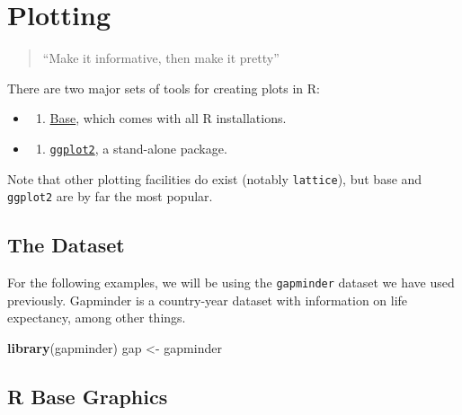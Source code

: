 \documentclass[
]{book}
\newenvironment{Shaded}{\begin{snugshade}}{\end{snugshade}}
\newcommand{\KeywordTok}[1]{\textcolor[rgb]{0.13,0.29,0.53}{\textbf{#1}}}
\newcommand{\NormalTok}[1]{#1}
\newcommand{\StringTok}[1]{\textcolor[rgb]{0.31,0.60,0.02}{#1}}
\providecommand{\tightlist}{%
  \setlength{\itemsep}{0pt}\setlength{\parskip}{0pt}}
\begin{document}
\hypertarget{plotting}{%
\chapter{Plotting}\label{plotting}}

\begin{quote}
``Make it informative, then make it pretty''
\end{quote}

There are two major sets of tools for creating plots in R:

\begin{itemize}
\item
  \begin{enumerate}
  \def\labelenumi{\arabic{enumi}.}
  \tightlist
  \item
    \protect\hyperlink{1-r-base-graphics}{Base}, which comes with all R installations.
  \end{enumerate}
\item
  \begin{enumerate}
  \def\labelenumi{\arabic{enumi}.}
  \setcounter{enumi}{1}
  \tightlist
  \item
    \protect\hyperlink{2-ggplot2}{\texttt{ggplot2}}, a stand-alone package.
  \end{enumerate}
\end{itemize}

Note that other plotting facilities do exist (notably \texttt{lattice}), but base and \texttt{ggplot2} are by far the most popular.

\hypertarget{the-dataset}{%
\section{The Dataset}\label{the-dataset}}

For the following examples, we will be using the \texttt{gapminder} dataset we have used previously. Gapminder is a country-year dataset with information on life expectancy, among other things.

\begin{Shaded}
\begin{Highlighting}[]
\KeywordTok{library}\NormalTok{(gapminder)}
\NormalTok{gap <-}\StringTok{ }\NormalTok{gapminder}
\end{Highlighting}
\end{Shaded}

\hypertarget{r-base-graphics}{%
\section{R Base Graphics}\label{r-base-graphics}}
\end{document}
